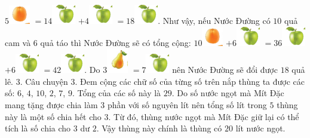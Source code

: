 \vskip 0.1cm
$5$\includegraphics{6}  $= 14$\includegraphics{5}  $+ 4$\includegraphics{5}  $= 18$\includegraphics{5}.
\vskip 0.1cm
Như vậy, nếu Nước Đường có $10$ quả cam và $6$ quả táo thì Nước Đường sẽ có tổng cộng:
\vskip 0.1cm
$10$\includegraphics{6}  $+ 6$\includegraphics{5}  $= 36$\includegraphics{5}  $+ 6$\includegraphics{5}  $= 42$\includegraphics{5}.
\vskip 0.1cm
Do $3$\includegraphics{4}  $= 7$\includegraphics{5}  nên Nước Đường sẽ đổi được $18$ quả lê.
\vskip 0.1cm
$3.$
\vskip 0.1cm
Câu chuyện $3$.
\vskip 0.1cm
Đem cộng các chữ số của từng số trên nắp thùng ta được các số: $6$, $4$, $10$, $2$, $7$, $9$. Tổng của các số này là $29$. Do số nước ngọt mà Mít Đặc mang tặng được chia làm $3$ phần với số nguyên lít nên tổng số lít trong $5$ thùng này là một số chia hết cho $3$. Từ đó, thùng nước ngọt mà Mít Đặc giữ lại có thể tích là số chia cho $3$ dư $2$. Vậy thùng này chính là thùng có $20$ lít nước ngọt.
